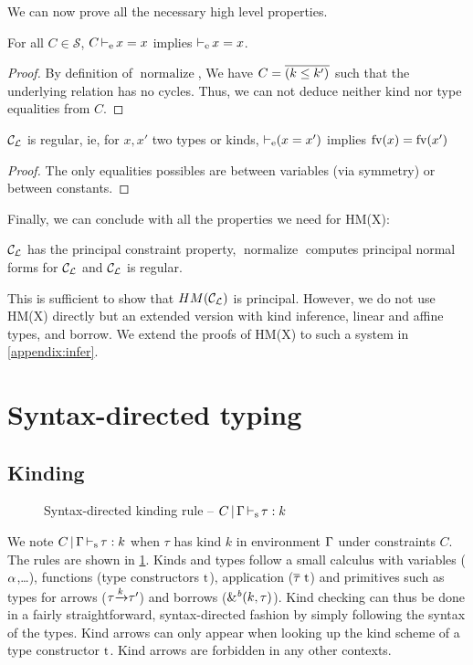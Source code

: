 We can now prove all the necessary high level properties.

\begin{lemma}
  For all $C\in\mathcal S$, $C \operatorname{\vdash_e} x = x$ implies
  $\operatorname{\vdash_e} x = x$.
\end{lemma}
\begin{proof}
  By definition of $\operatorname{normalize}$, We have $C = \overline{(k \leq k')_{{}}}$
  such that the underlying relation has no cycles.
  Thus, we can not deduce neither kind nor type equalities from $C$.
\end{proof}

\begin{property}
  ${\mathcal C_{\mathcal L}}$ is regular, ie, for $x, x'$ two types or kinds,
  $\operatorname{\vdash_e} (x = x')$ implies
  $\operatorname{fv}(x) = \operatorname{fv}(x')$
\end{property}
\begin{proof}
  The only equalities possibles are between variables (via symmetry) or
  between constants.
\end{proof}

Finally, we can conclude with all the properties we need for
HM(X):

\begin{theorem}
  ${\mathcal C_{\mathcal L}}$ has the principal constraint property,
  $\operatorname{normalize}$ computes principal normal forms for ${\mathcal C_{\mathcal L}}$
  and ${\mathcal C_{\mathcal L}}$ is regular.
\end{theorem}


This is sufficient to show that $HM({\mathcal C_{\mathcal L}})$ is principal. However,
we do not use HM(X) directly but an extended version with kind inference,
linear and affine types, and borrow.
We extend the proofs of HM(X) to such a system in \cref{appendix:infer}.


\section{Syntax-directed typing}
\label{appendix:sdtyping}

\subsection{Kinding}
%
\begin{figure}[bt]
  \centering
  
  \caption{Syntax-directed kinding rule --
    $C \operatorname{|} \Gamma \operatorname{\vdash_s} \tau : k$}
  \label{rules:sd-kinding}
\end{figure}

We note $C \operatorname{|} \Gamma \operatorname{\vdash_s} \tau : k$
when $\tau$ has kind $k$ in environment $\Gamma$ under constraints $C$.
The rules are shown in \cref{rules:sd-kinding}.
Kinds and types follow a small calculus with variables ($\alpha$,\dots),
functions (type constructors $\mathrm{t}$), application ($\overline{\tau_{{}}}\ \mathrm{t}$)
and primitives such as types for arrows ($\tau{\xrightarrow{k}}\tau'$) and
borrows (${\&}^{\textit{b}}(k,\tau)$).
Kind checking can thus be done in a fairly straightforward, syntax-directed
fashion by simply following
the syntax of the types. Kind arrows can only appear when looking
up the kind scheme of a type constructor $\mathrm{t}$. Kind arrows are forbidden
in any other contexts.

